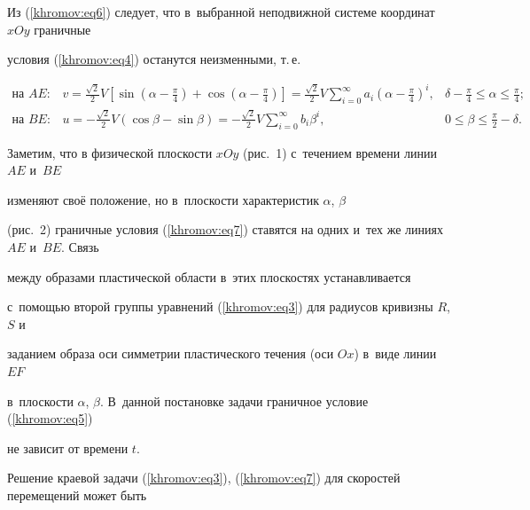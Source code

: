 Из (\ref{khromov:eq6}) следует, что в~выбранной неподвижной системе координат $xOy$ граничные 

условия (\ref{khromov:eq4}) останутся неизменными, т.\,е.

\begin{equation}

\label{khromov:eq7}

\begin{array}{lll}

 \text{на $AE$}: & v = \frac{\sqrt 2 }{2}V\left[ {\sin \left( {\alpha - \frac{\pi }{4}} \right) + \cos \left( {\alpha - \frac{\pi }{4}} \right)} \right] = \frac{\sqrt 2 }{2}V\sum\limits_{i = 0}^\infty {a_i \left( {\alpha 

- \frac{\pi }{4}} \right)^i} , & \delta - \frac{\pi }{4} \leqslant \alpha \leqslant \frac{\pi }{4}; \\ 

\text{на $BE$}: & u = - \frac{\sqrt 2 }{2}V\left( {\cos \beta - \sin \beta } \right) = - \frac{\sqrt 2 }{2}V\sum\limits_{i = 0}^\infty {b_i \beta ^i}, & 0 \leqslant \beta \leqslant \frac{\pi }{2} - \delta .

 \end{array}

\end{equation}





Заметим, что в физической плоскости $xOy$ (рис.~1) с~течением времени линии $AE$ и~$BE$ 

изменяют своё положение, но в~плоскости характеристик $\alpha$, $\beta $ 

(рис.~2) граничные условия (\ref{khromov:eq7}) ставятся на одних и~тех же линиях $AE$ и~$BE$. Связь 

между образами пластической области в~этих плоскостях устанавливается 

с~помощью второй группы уравнений (\ref{khromov:eq3}) для радиусов кривизны $R$, $S$ и 

заданием образа оси симметрии пластического течения (оси $Ox$) в~виде линии $EF$ 

в~плоскости $\alpha$, $\beta $. В~данной постановке задачи граничное условие (\ref{khromov:eq5}) 

не зависит от времени $t$.



Решение краевой задачи (\ref{khromov:eq3}), (\ref{khromov:eq7}) для скоростей перемещений может быть 

